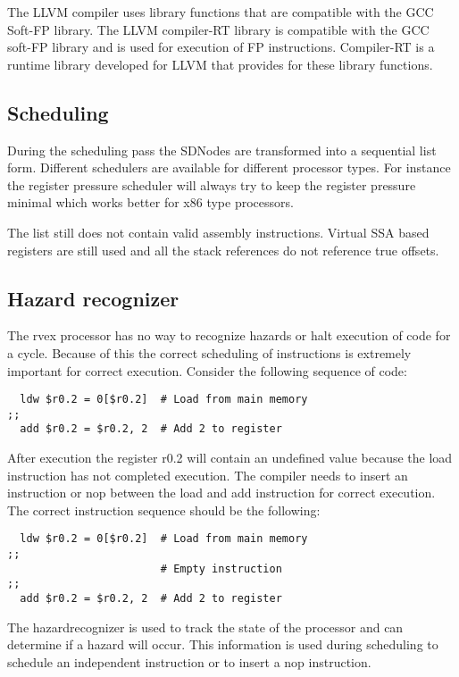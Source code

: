 The LLVM compiler uses library functions that are compatible with the GCC Soft-FP library. The LLVM compiler-RT library is compatible with the GCC soft-FP library and is used for execution of FP instructions. Compiler-RT is a runtime library developed for LLVM that provides for these library functions.

\subsection{Scheduling}
During the scheduling pass the SDNodes are transformed into a sequential list form. Different schedulers are available for different processor types. For instance the register pressure scheduler will always try to keep the register pressure minimal which works better for x86 type processors.

The list still does not contain valid assembly instructions. Virtual SSA based registers are still used and all the stack references do not reference true offsets.

\subsection{Hazard recognizer}
The rvex processor has no way to recognize hazards or halt execution of code for a cycle. Because of this the correct scheduling of instructions is extremely important for correct execution. Consider the following sequence of code:

\begin{lstlisting}
  ldw $r0.2 = 0[$r0.2]  # Load from main memory
;;
  add $r0.2 = $r0.2, 2  # Add 2 to register
\end{lstlisting}

After execution the register r0.2 will contain an undefined value because the load instruction has not completed execution. The compiler needs to insert an instruction or nop between the load and add instruction for correct execution. The correct instruction sequence should be the following:

\begin{lstlisting}
  ldw $r0.2 = 0[$r0.2]  # Load from main memory
;;
                        # Empty instruction
;;
  add $r0.2 = $r0.2, 2  # Add 2 to register
\end{lstlisting}

The hazardrecognizer is used to track the state of the processor and can determine if a hazard will occur. This information is used during scheduling to schedule an independent instruction or to insert a nop instruction.

